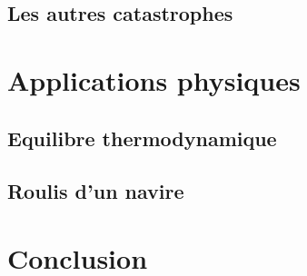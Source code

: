 \documentclass{beamer}
\theoremstyle{definition}
\begin{document}
\subsection{Les autres catastrophes}

\section{Applications physiques}
\subsection{Equilibre thermodynamique}
\subsection{Roulis d'un navire}

\section*{Conclusion}
\frame{}
\end{document}
